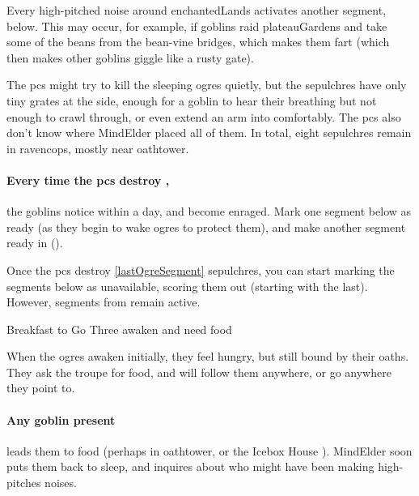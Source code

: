 \begin{multicols}{2}

\noindent
Every high-pitched noise around \gls{enchantedLands} activates another \gls{segment}, below.
This may occur, for example, if goblins raid \gls{plateauGardens} and take some of the beans from the bean-vine bridges, which makes them fart (which then makes other goblins giggle like a rusty gate).

The \glspl{pc} might try to kill the sleeping \glspl{ogre} quietly, but the \glspl{sepulchre} have only tiny grates at the side, enough for a goblin to hear their breathing but not enough to crawl through, or even extend an arm into comfortably.
The \glspl{pc} also don't know where \gls{MindElder} placed all of them.
In total, eight \glspl{sepulchre} remain in \gls{ravencops}, mostly near \gls{oathtower}.

\paragraph{Every time the \glspl{pc} destroy ,}
the goblins notice within a day, and become enraged.
Mark one \gls{segment} below as ready (as they begin to wake \glspl{ogre} to protect them), and make another \gls{segment} ready in  ().

Once the \glspl{pc} destroy \ref{lastOgreSegment} \glspl{sepulchre}, you can start marking the \glspl{segment} below as unavailable, scoring them out (starting with the last).
However, \glspl{segment} from  remain active.

\setcounter{segNo}{-1}
{Breakfast to Go}%
{Three  awaken and need food}%

When the \glspl{ogre} awaken initially, they feel hungry, but still bound by their oaths.
They ask the troupe for food, and will follow them anywhere, or go anywhere they point to.


\paragraph{Any goblin present}
leads them to food (perhaps in \gls{oathtower}, or the Icebox House ).
\Gls{MindElder} soon puts them back to sleep, and inquires about who might have been making high-pitches noises.


\end{multicols}
